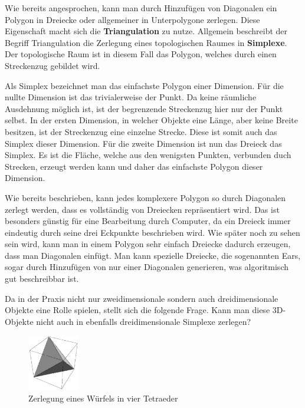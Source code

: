 Wie bereits angesprochen, kann man durch Hinzufügen von Diagonalen ein Polygon in Dreiecke oder allgemeiner in Unterpolygone 
zerlegen. Diese Eigenschaft macht sich die \textbf{Triangulation} zu nutze. Allgemein beschreibt der Begriff Triangulation die Zerlegung eines 
topologischen Raumes in \textbf{Simplexe}.\cite{polytri3} Der topologische Raum ist in diesem Fall das Polygon, welches durch einen Streckenzug gebildet wird.

Als Simplex bezeichnet man das einfachste Polygon einer Dimension.\cite{simplex} Für die nullte Dimension ist das trivialerweise der Punkt. Da keine räumliche Ausdehnung 
möglich ist, ist der begrenzende Streckenzug hier nur der Punkt selbst.
In der ersten Dimension, in welcher Objekte eine Länge, aber keine Breite besitzen, ist der Streckenzug eine einzelne Strecke. Diese ist somit auch das Simplex dieser Dimension.
Für die zweite Dimension ist nun das Dreieck das Simplex. Es ist die Fläche, welche aus den wenigsten Punkten, verbunden duch Strecken, erzeugt werden kann und daher das einfachste Polygon dieser 
Dimension. 

Wie bereits beschrieben, kann jedes komplexere Polygon so durch Diagonalen zerlegt werden, dass es vollständig von Dreiecken repräsentiert wird. Das ist besonders günstig für 
eine Bearbeitung durch Computer, da ein Dreieck immer eindeutig durch seine drei Eckpunkte beschrieben wird. Wie später noch zu sehen sein wird, kann man in einem Polygon sehr einfach Dreiecke dadurch erzeugen, 
dass man Diagonalen einfügt. Man kann spezielle Dreiecke, die sogenannten Ears, sogar durch Hinzufügen von nur einer Diagonalen generieren, was algoritmisch gut beschreibbar ist.

Da in der Praxis nicht nur zweidimensionale sondern auch dreidimensionale Objekte eine Rolle spielen, stellt sich die folgende Frage. Kann man diese 3D-Objekte nicht auch in ebenfalls dreidimensionale 
Simplexe zerlegen? 

\begin{figure}
  \centering
  \includegraphics[width=0.2\textwidth]{bilder/cube.png}
  \caption[Zerlegung eines Würfels in vier Tetraeder]{\centering Zerlegung eines Würfels in vier Tetraeder \cite{cubecut}}
  \label{fig:cubecut}
\end{figure}


